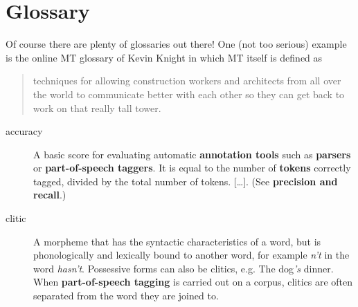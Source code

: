 \newpage
{}
{}
\chapter*{Glossary}

Of course there are plenty of glossaries out there! One (not too serious) example is the online MT glossary of Kevin Knight  in which MT itself is defined as 
\begin{quote}
techniques for allowing construction workers and architects from all over the world to communicate better with each other so they can get back to work on that really tall tower. 
\end{quote}

\begin{description}
\item[accuracy] A basic score for evaluating automatic \textbf{annotation tools} such as \textbf{parsers} or \textbf{part-of-speech taggers}. It is equal to the number of \textbf{tokens} correctly tagged, divided by the total number of tokens. [\ldots]. (See \textbf{precision and recall}.)

\item[clitic] A morpheme that has the syntactic characteristics of a word, but is phonologically and lexically bound to another word, for example \textit{n't} in the word \textit{hasn't}. Possessive forms can also be clitics, e.g. The dog\textit{'s} dinner. When \textbf{part-of-speech tagging} is carried out on a corpus, clitics are often separated from the word they are joined to.

\end{description}

